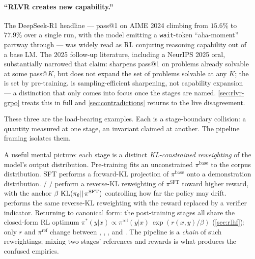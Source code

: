\paragraph{``RLVR creates new capability.'' } The DeepSeek-R1
\citep{deepseek-r1} headline --- pass@1 on AIME 2024 climbing from
$15.6\%$ to $77.9\%$ over a single  run, with the model emitting a
\texttt{wait}-token ``aha-moment'' partway through --- was widely read
as RL conjuring reasoning capability out of a base LM. The 2025
follow-up literature, including a NeurIPS 2025 oral, substantially
narrowed that claim:  sharpens pass@1 on problems already solvable
at some pass@$K$, but does not expand the set of problems solvable at
any $K$; the  is set by pre-training.  is
sampling-efficient sharpening, not capability expansion --- a
distinction that only comes into focus once the stages are named.
\cref{sec:rlvr-grpo} treats this in full and \cref{sec:contradictions}
returns to the live disagreement.

These three are the load-bearing examples. Each is a stage-boundary
collision: a quantity measured at one stage, an invariant claimed at
another. The pipeline framing isolates them.

\begin{intuition}
A useful mental picture: each stage is a distinct
\emph{KL-constrained reweighting} of the model's output distribution.
Pre-training fits an unconstrained $\pi^{\mathrm{base}}$ to the corpus
distribution. SFT performs a forward-KL projection of $\pi^{\mathrm{base}}$
onto a demonstration distribution.  /  /  perform a reverse-KL
reweighting of $\pi^{\mathrm{SFT}}$ toward higher reward, with the anchor
$\beta\,\operatorname{KL}(\pi_\theta \|\, \pi^{\mathrm{SFT}})$ controlling how far the
policy may drift.  performs the same reverse-KL reweighting with the
reward replaced by a verifier indicator. Returning to canonical form: the
post-training stages all share the closed-form RL optimum
$\pi^*(y|x) \propto \pi^{\mathrm{ref}}(y|x)\,\exp(r(x,y)/\beta)$
(\cref{sec:rlhf}); only $r$ and $\pi^{\mathrm{ref}}$ change between
, , , and . The pipeline is a \emph{chain} of such
reweightings; mixing two stages' references and rewards is what
produces the confused empirics.
\end{intuition}

